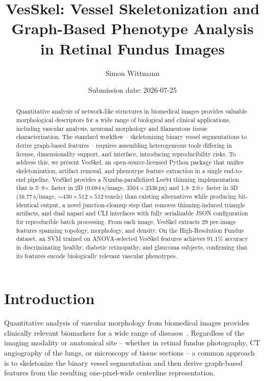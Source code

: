 \documentclass[11pt]{article}
\title{VesSkel: Vessel Skeletonization and Graph-Based Phenotype Analysis in
Retinal Fundus Images}
\author{Simon Wittmann}
\affil{
  Project report\\ %
  Biomedical Network Science\\
  Module title: Project Biomedical Network Science\\
  Semester: SS 2026\\
  Matriculation number: 23760671\\
  Biomedical Network Science Lab, Department Artificial Intelligence in
Biomedical Engineering, Friedrich-Alexander-Universität Erlangen-Nürnberg}
\date{Submission date: 2026-07-25}
\begin{document}
\maketitle

\begin{abstract}
  Quantitative analysis of network-like structures in biomedical
  images provides valuable morphological descriptors for a wide range
  of biological and clinical applications, including vascular
  analysis, neuronal morphology and filamentous tissue
  characterization. The standard workflow -- skeletonizing binary
  vessel segmentations to derive graph-based features -- requires
  assembling heterogeneous tools differing in license, dimensionality
  support, and interface, introducing reproducibility risks. To
  address this, we present VesSkel, an open-source-licensed Python
  package that unifies skeletonization, artifact removal, and
  phenotype feature extraction in a single end-to-end pipeline.
  VesSkel provides a Numba-parallelized Lee94 thinning implementation
  that is 5--9$\times$ faster in 2D (0.084\,s/image,
  $3504\times2336$\,px) and 1.8--2.0$\times$ faster in 3D
  (16.77\,s/image, $\sim430\times512\times512$\,voxels) than existing
  alternatives while producing bit-identical output, a novel
  junction-cleanup step that removes thinning-induced triangle
  artifacts, and dual napari and CLI interfaces with fully
  serializable JSON configuration for reproducible batch processing.
  From each image, VesSkel extracts 29 per-image features spanning
  topology, morphology, and density. On the High-Resolution Fundus
  dataset, an SVM trained on ANOVA-selected VesSkel features achieves
  91.1\% accuracy in discriminating healthy, diabetic retinopathy,
  and glaucoma subjects, confirming that its features encode
  biologically relevant vascular phenotypes.
\end{abstract}

\clearpage

\tableofcontents

\clearpage

\section{Introduction}\label{sec:introduction}

Quantitative analysis of vascular morphology from biomedical images
provides clinically relevant biomarkers for a wide range of
diseases~\cite{skel_survey}. Regardless of the imaging
modality or anatomical site -- whether in retinal fundus photography,
CT angiography of the lungs, or microscopy of tissue sections -- a
common approach~\cite{skel_survey} is to skeletonize the binary
vessel segmentation and then derive graph-based features from the
resulting one-pixel-wide centerline representation.
\end{document}

